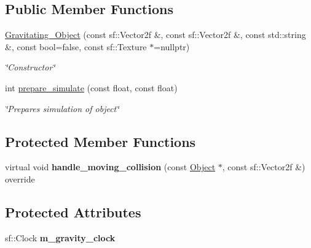 \subsection*{Public Member Functions}
\begin{DoxyCompactItemize}
\item 
\hyperlink{classGravitating__Object_a7319a97eb2d84afbe66c5e0040bd3973}{Gravitating\+\_\+\+Object} (const sf\+::\+Vector2f \&, const sf\+::\+Vector2f \&, const std\+::string \&, const bool=false, const sf\+::\+Texture $\ast$=nullptr)
\begin{DoxyCompactList}\small\item\em \char`\"{}\+Constructor\char`\"{} \end{DoxyCompactList}\item 
int \hyperlink{classGravitating__Object_a187404d6df6ff16a86a33a3f4a8aab85}{prepare\+\_\+simulate} (const float, const float)
\begin{DoxyCompactList}\small\item\em \char`\"{}\+Prepares simulation of object\char`\"{} \end{DoxyCompactList}\end{DoxyCompactItemize}
\subsection*{Protected Member Functions}
\begin{DoxyCompactItemize}
\item 
\hypertarget{classGravitating__Object_ad059f059b3699edb3edff11fdd7fba29}{virtual void {\bfseries handle\+\_\+moving\+\_\+collision} (const \hyperlink{classObject}{Object} $\ast$, const sf\+::\+Vector2f \&) override}\label{classGravitating__Object_ad059f059b3699edb3edff11fdd7fba29}

\end{DoxyCompactItemize}
\subsection*{Protected Attributes}
\begin{DoxyCompactItemize}
\item 
\hypertarget{classGravitating__Object_abda4e488702c931d99b47785db6be33b}{sf\+::\+Clock {\bfseries m\+\_\+gravity\+\_\+clock}}\label{classGravitating__Object_abda4e488702c931d99b47785db6be33b}

\end{DoxyCompactItemize}


